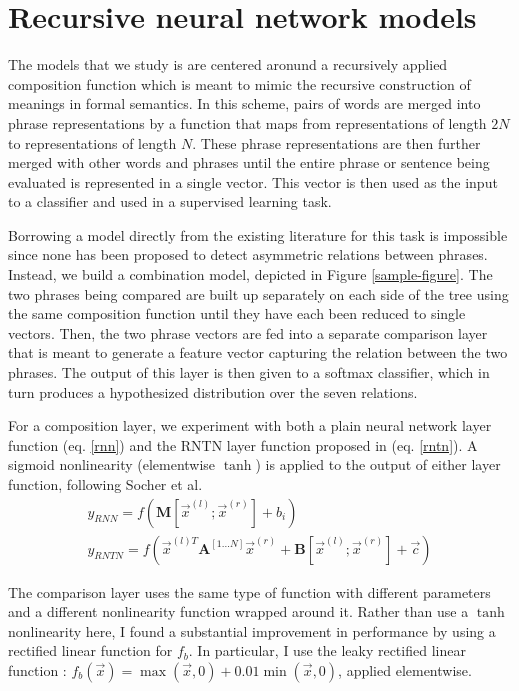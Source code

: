 \section{Recursive neural network models}


The models that we study is are centered aronund a recursively applied composition function which is meant to mimic the recursive construction of meanings in formal semantics. In this scheme, pairs of words are merged into phrase representations by a function that maps from representations of length $2N$ to representations of length $N$. These phrase representations are then further merged with other words and phrases until the entire phrase or sentence being evaluated is represented in a single vector. This vector is then used as the input to a classifier and used in a supervised learning task.

Borrowing a model directly from the existing literature for this task is impossible since none has been proposed to detect asymmetric relations between phrases. Instead, we build a combination model, depicted in Figure \ref{sample-figure}. The two phrases being compared are built up separately on each side of the tree using the same composition function until they have each been reduced to single vectors. Then, the two phrase vectors are fed into a separate comparison layer that is meant to generate a feature vector capturing the relation between the two phrases. The output of this layer is then given to a softmax classifier, which in turn produces a hypothesized distribution over the seven relations.

For a composition layer, we experiment with both a plain neural network layer function (eq. \ref{rnn}) and the RNTN layer function proposed in \citet{chen2013learning} (eq. \ref{rntn}). A sigmoid nonlinearity (elementwise $\tanh$) is applied to the output of either layer function, following Socher et al.
\begin{gather} \label{rnn}
y_{RNN} = f(\mathbf{M} [\vec{x}^{(l)}; \vec{x}^{(r)}] + b_i)\\ %
\label{rntn}
y_{RNTN} = f(\vec{x}^{(l)T} \mathbf{A}^{[1...N]} \vec{x}^{(r)} + \mathbf{B} [\vec{x}^{(l)}; \vec{x}^{(r)}] + \vec{c})
\end{gather} %

The comparison layer uses the same type of function with different parameters and a different nonlinearity function wrapped around it. Rather than use a $\tanh$ nonlinearity here, I found a substantial improvement in performance by using a rectified linear function for $f_{b}$. In particular, I use the leaky rectified linear function \cite{maasrectifier}: $f_{b}(\vec{x})=\max(\vec{x}, 0) + 0.01\min(\vec{x}, 0)$,  applied elementwise. 

